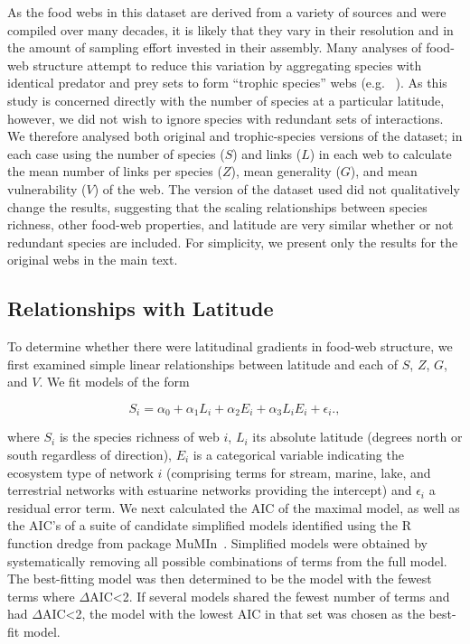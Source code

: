 \documentclass[12pt]{article}
\begin{document}
  As the food webs in this dataset are derived from a variety of sources and were compiled over many decades, it
  is likely that they vary in their resolution and in the amount of sampling effort invested in their assembly.
  Many analyses of food-web structure attempt to reduce this variation by aggregating species with identical predator and prey
  sets to form ``trophic species'' webs (e.g. ~\citep{Martinez1991,Vermaat2009,Dunne2004,Dunne2013}). As this study
  is concerned directly with the number of species at a particular latitude, however, we did not wish to ignore 
  species with redundant sets of interactions. We therefore analysed both original and trophic-species versions
  of the dataset; in each case using the number of species ($S$) and 
  links ($L$) in each web to calculate the mean number of links per species ($Z$), mean generality 
  ($G$), and mean vulnerability ($V$) of the web. 
  The version of the dataset used did not qualitatively change the results, suggesting that
  the scaling relationships between species richness, other food-web properties, and latitude are very 
  similar whether or not redundant species are included. For simplicity, we present only
  the results for the original webs in the main text. 


\subsection*{Relationships with Latitude}

  To determine whether there were latitudinal gradients in food-web structure,
  we first examined simple linear relationships between latitude and each of $S$, $Z$, $G$, and $V$. 
  We fit models of the form

  \begin{equation}
  \label{Latfull}
  S_{i} = \alpha_{0} + \alpha_{1} L_{i} + \alpha_{2} E_{i} + \alpha_{3} L_{i} E_{i} + \epsilon_{i} .,
  \end{equation}

  \noindent where $S_{i}$ is the species richness of web $i$, $L_{i}$ its absolute
  latitude (degrees north or south  regardless of direction), $E_{i}$ is a categorical
  variable indicating the ecosystem type of network $i$ (comprising terms for stream, 
  marine, lake, and terrestrial networks with estuarine
  networks providing the intercept) and $\epsilon_{i}$ a residual error term. 
  We next calculated the AIC
  of the maximal model, as well as the AIC's of a suite of candidate simplified models identified
  using the R~\citep{R} function dredge from package MuMIn~\citep{MuMIn}. 
  Simplified models were obtained by
  systematically removing all possible combinations of terms from the full model.
  The best-fitting model was then determined to be the model with the fewest terms 
  where $\Delta$AIC\textless2. If several models shared the fewest number of terms 
  and had $\Delta$AIC\textless2, the model with the lowest AIC in that set was chosen as the best-fit
  model.
\end{document}
